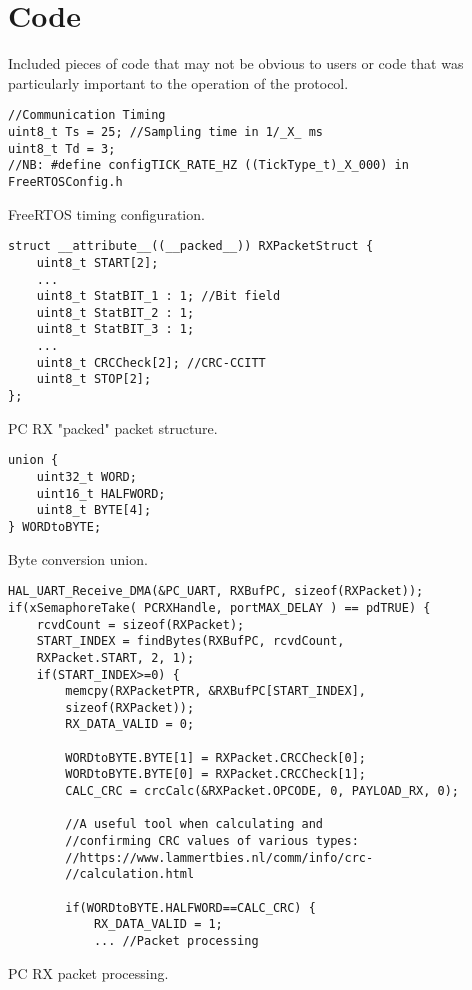 \chapter{Code}
Included pieces of code that may not be obvious to users or code that was particularly important to the operation of the protocol.


\begin{listing}[ht]
\begin{verbatim}
//Communication Timing
uint8_t Ts = 25; //Sampling time in 1/_X_ ms
uint8_t Td = 3;
//NB: #define configTICK_RATE_HZ ((TickType_t)_X_000) in FreeRTOSConfig.h
\end{verbatim}
\caption{FreeRTOS timing configuration.}
\label{listing:FreeRTOS timing}
\end{listing}

\begin{listing}[ht]
\begin{verbatim}
struct __attribute__((__packed__)) RXPacketStruct {
	uint8_t START[2];
	...
	uint8_t StatBIT_1 : 1; //Bit field
	uint8_t StatBIT_2 : 1;
	uint8_t StatBIT_3 : 1;
	...
	uint8_t CRCCheck[2]; //CRC-CCITT        
	uint8_t STOP[2];
};
\end{verbatim}
\caption{PC RX "packed" packet structure.}
\label{listing:packet-packet}
\end{listing}

\begin{listing}[ht]
\begin{verbatim}
union {
	uint32_t WORD;
	uint16_t HALFWORD;
	uint8_t BYTE[4];
} WORDtoBYTE;
\end{verbatim}
\caption{Byte conversion union.}
\label{listing:Byte conversion union}
\end{listing}

\begin{listing}[ht]
\begin{verbatim}
HAL_UART_Receive_DMA(&PC_UART, RXBufPC, sizeof(RXPacket));
if(xSemaphoreTake( PCRXHandle, portMAX_DELAY ) == pdTRUE) {
	rcvdCount = sizeof(RXPacket);
	START_INDEX = findBytes(RXBufPC, rcvdCount, 
	RXPacket.START, 2, 1);
	if(START_INDEX>=0) {
		memcpy(RXPacketPTR, &RXBufPC[START_INDEX], 		
		sizeof(RXPacket));
		RX_DATA_VALID = 0;

		WORDtoBYTE.BYTE[1] = RXPacket.CRCCheck[0];
		WORDtoBYTE.BYTE[0] = RXPacket.CRCCheck[1];
		CALC_CRC = crcCalc(&RXPacket.OPCODE, 0, PAYLOAD_RX, 0);
		
		//A useful tool when calculating and 
		//confirming CRC values of various types: 
		//https://www.lammertbies.nl/comm/info/crc-		
		//calculation.html

		if(WORDtoBYTE.HALFWORD==CALC_CRC) {
			RX_DATA_VALID = 1;
			... //Packet processing
\end{verbatim}
\caption{PC RX packet processing.}
\label{listing:PC RX packet processing}
\end{listing}

